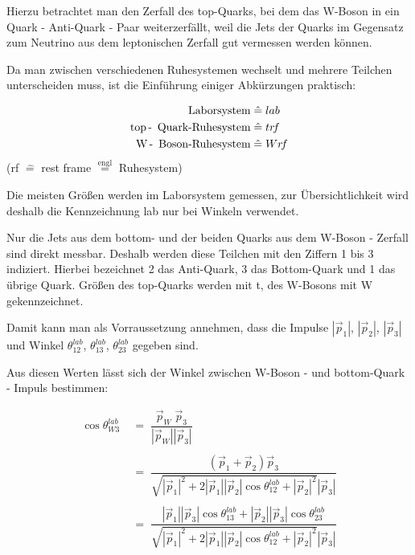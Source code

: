 \documentclass[
a4paper,                                %
twoside,                                %
BCOR1.4cm,                      %
ngerman,                                %
10pt,                           %
headings=normal,                %
headsepline,                    %
clearplainpage, %
final,                                  %
div=14,
parskip=full
]{scrbook}
\begin{document}
Hierzu betrachtet man den Zerfall  des top-Quarks, bei dem das W-Boson in ein Quark - Anti-Quark - Paar weiterzerf\"allt, weil die Jets der Quarks im Gegensatz zum Neutrino aus dem leptonischen Zerfall gut vermessen werden k\"onnen.  

Da man zwischen verschiedenen Ruhesystemen wechselt und mehrere Teilchen unterscheiden muss, ist die Einf\"uhrung einiger Abk\"urzungen praktisch:

\begin{align}
\text{Laborsystem} &\mathrel{\hat=} lab
\nonumber
\\
\text{top\! - \! Quark-Ruhesystem} &\mathrel{\hat=} tr\!f
\nonumber
\\
\text{W\! - \! Boson-Ruhesystem} &\mathrel{\hat=} Wr\!f
\nonumber
\end{align}
(rf $ \mathrel{\hat=} $ rest frame $ \stackrel{\mathrm{engl}}= $ Ruhesystem)

Die meisten Gr\"o\ss en werden im Laborsystem gemessen, zur \"Ubersichtlichkeit wird deshalb die Kennzeichnung lab nur bei Winkeln verwendet.

Nur die Jets aus dem bottom- und der beiden Quarks aus dem W-Boson - Zerfall sind direkt messbar. Deshalb werden diese Teilchen mit den Ziffern 1 bis 3 indiziert. Hierbei bezeichnet 2 das Anti-Quark, 3 das Bottom-Quark und 1 das \"ubrige Quark. Gr\"o\ss en des top-Quarks werden mit t, des W-Bosons mit W gekennzeichnet.

Damit kann man als Vorraussetzung annehmen, dass die Impulse 
$ |\vec{p}_{1}| $, $ |\vec{p}_{2}| $, $ |\vec{p}_{3}| $ und Winkel
$ \theta_{12}^{lab} $, $ \theta_{13}^{lab} $, $ \theta_{23}^{lab} $ gegeben sind. 

Aus diesen Werten l\"asst sich der Winkel zwischen W-Boson - und bottom-Quark - Impuls bestimmen:

\begin{align}
	\cos \theta_{W3}^{lab}
\;&=\;
	\dfrac{\vec{p}_{W}\;\vec{p}_{3}}{|\vec{p}_{W}| |\vec{p}_{3}|}
\nonumber
\\
\nonumber
\\
\;&=\;
	\dfrac{\left(\vec{p}_{1} + \vec{p}_{2}\right) \vec{p}_{3}}
	{\sqrt{\left|\vec{p}_{1}\right|^{2} + 
	2 \left|\vec{p}_{1}\right| \left|\vec{p}_{2}\right| 
	\cos \theta_{12}^{lab}
	+ \left|\vec{p}_{2}\right|^{2}} \left|\vec{p}_{3}\right|}
\nonumber
\\
\nonumber
\\
\;&=\;
	\dfrac{\left|\vec{p}_{1}\right| \left|\vec{p}_{3}\right| 
	\cos \theta_{13}^{lab}
	+ \left|\vec{p}_{2}\right| \left|\vec{p}_{3}\right| 
	\cos \theta_{23}^{lab}}
	{\sqrt{\left|\vec{p}_{1}\right|^{2} + 
	2 \left|\vec{p}_{1}\right| \left|\vec{p}_{2}\right| 
	\cos \theta_{12}^{lab}
	+ \left|\vec{p}_{2}\right|^{2}} \left|\vec{p}_{3}\right|}
\label{costhetaW3labmessung}
\end{align}
\end{document}
